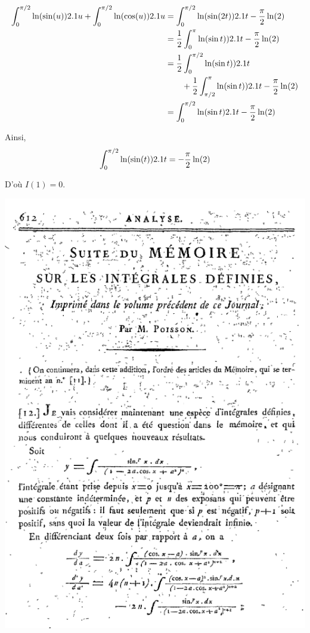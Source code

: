 \begin{solution}
\begin{reponses}
\begin{align*}
\int_0^{\pi/2} \ln(\sin(u)) 2.1 u + \int_0^{\pi/2} \ln(\cos(u)) 2.1 u
&= \int_0^{\pi/2} \ln(\sin(2 t)) 2.1 t - \frac{\pi}{2} \ln(2) \\
&= \frac{1}{2} \int_0^\pi \ln(\sin t)) 2.1 t - \frac{\pi}{2} \ln(2) \\
&= \frac{1}{2} \int_0^{\pi/2} \ln(\sin t)) 2.1 t\\
&\qquad + \frac{1}{2} \int_{\pi/2}^{\pi} \ln(\sin t)) 2.1 t - \frac{\pi}{2} \ln(2) \\
&= \int_0^{\pi/2} \ln(\sin t) 2.1 t - \frac{\pi}{2} \ln(2)
\end{align*}

Ainsi,
\[
\int_0^{\pi/2} \ln(\sin(t)) 2.1 t = -\frac{\pi}{2} \ln(2)
\]

D'où $I(1) = 0$.
\end{reponses}
\end{solution}

\begin{marginfigure}[-5cm]
    \centering
    \includegraphics[scale=0.08]{illustrations/Journal_de_l_ecole_polytechnique_cahier_17_1815.png}
\end{marginfigure}
